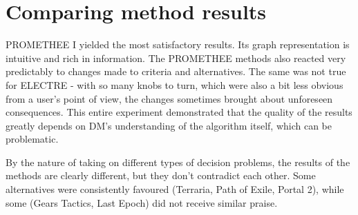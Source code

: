 \documentclass{article}
\begin{document}
\clearpage
\section{Comparing method results}

PROMETHEE I yielded the most satisfactory results. Its graph representation is intuitive and rich in information. The PROMETHEE methods also reacted very predictably to changes made to criteria and alternatives. The same was not true for ELECTRE - with so many knobs to turn, which were also a bit less obvious from a user's point of view, the changes sometimes brought about unforeseen consequences. This entire experiment demonstrated that the quality of the results greatly depends on DM's understanding of the algorithm itself, which can be problematic.

By the nature of taking on different types of decision problems, the results of the methods are clearly different, but they don't contradict each other. Some alternatives were consistently favoured (Terraria, Path of Exile, Portal 2), while some (Gears Tactics, Last Epoch) did not receive similar praise.
\end{document}
